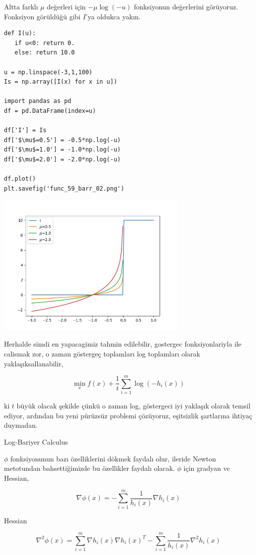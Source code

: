 \documentclass[12pt,fleqn]{article}\usepackage{../../common}
\begin{document}
Altta farklı $\mu$ değerleri için
$-\mu \log(-u)$ fonksiyonun değerlerini görüyoruz. Fonksiyon görüldüğü gibi
$I$'ya oldukca yakın.

\begin{verbatim}
def I(u): 
   if u<0: return 0.
   else: return 10.0

u = np.linspace(-3,1,100)
Is = np.array([I(x) for x in u])

import pandas as pd
df = pd.DataFrame(index=u)

df['I'] = Is
df['$\mu$=0.5'] = -0.5*np.log(-u)
df['$\mu$=1.0'] = -1.0*np.log(-u)
df['$\mu$=2.0'] = -2.0*np.log(-u)

df.plot()
plt.savefig('func_59_barr_02.png')
\end{verbatim}

\includegraphics[width=25em]{func_59_barr_02.png}

Herhalde simdi en yapacagimiz tahmin edilebilir, gostergec fonksiyonlariyla
ile calismak zor, o zaman göstergeç toplamları log toplamları olarak
yaklaşıksallanabilir,

$$
\min_x f(x) + \frac{1}{t} \sum_{i=1}^{m} \log(-h_i(x))
$$

ki $t$ büyük olacak şekilde çünkü o zaman log, göstergeci iyi yaklaşık
olarak temsil ediyor, ardından bu yeni pürüzsüz problemi çözüyoruz,
eşitsizlik şartlarına ihtiyaç duymadan. 

Log-Bariyer Calculus

$\phi$ fonksiyonunun bazı özelliklerini dökmek faydalı olur, ileride Newton
metotundan bahsettiğimizde bu özellikler faydalı olacak. $\phi$ için gradyan ve
Hessian,

$$
\nabla \phi(x) = - \sum_{i=1}^{m} \frac{1}{h_i(x)} \nabla h_i(x)
$$

Hessian

$$
\nabla^2 \phi(x) = 
\sum _{i=1}^{m} \nabla h_i(x) \nabla h_i(x)^T - 
\sum _{i=1}^{m} \frac{1}{h_i(x)} \nabla^2 h_i(x)
$$
\end{document}
